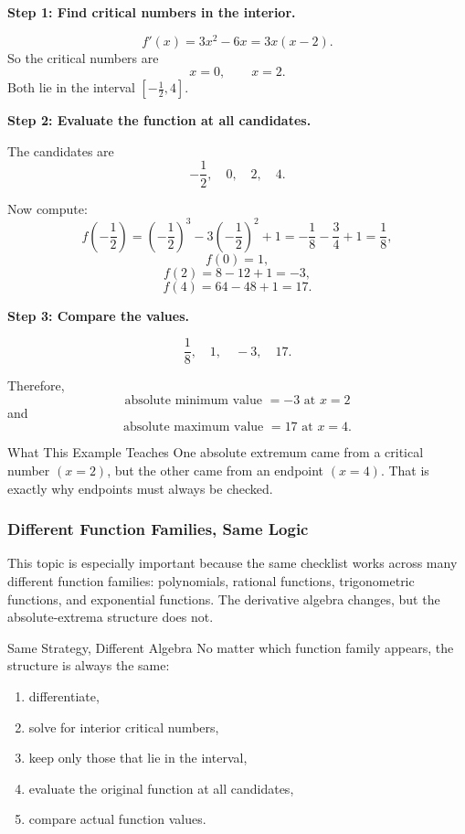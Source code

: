 \documentclass[11pt]{article}
\newcommand{\solution}{\noindent{\textbf{Solution.}}}
\newcommand{\unitsubtopic}[1]{%
\subsubsection{#1}
}
\begin{document}
\solution

\textbf{Step 1: Find critical numbers in the interior.}

\[
f'(x)=3x^2-6x=3x(x-2).
\]
So the critical numbers are
\[
x=0,\qquad x=2.
\]
Both lie in the interval \(\left[-\frac12,4\right]\).

\textbf{Step 2: Evaluate the function at all candidates.}

The candidates are
\[
-\frac12,\quad 0,\quad 2,\quad 4.
\]

Now compute:
\[
f\left(-\frac12\right)=\left(-\frac12\right)^3-3\left(-\frac12\right)^2+1
=-\frac18-\frac34+1=\frac18,
\]
\[
f(0)=1,
\]
\[
f(2)=8-12+1=-3,
\]
\[
f(4)=64-48+1=17.
\]

\textbf{Step 3: Compare the values.}

\[
\frac18,\quad 1,\quad -3,\quad 17.
\]

Therefore,
\[
\boxed{\text{absolute minimum value }=-3 \text{ at } x=2}
\]
and
\[
\boxed{\text{absolute maximum value }=17 \text{ at } x=4.}
\]

\begin{summarybox}{What This Example Teaches}
One absolute extremum came from a critical number \((x=2)\), but the other came from an endpoint \((x=4)\).
That is exactly why endpoints must always be checked.
\end{summarybox}
\newpage
\unitsubtopic{Different Function Families, Same Logic}

\noindent
This topic is especially important because the same checklist works across many different function families:
polynomials, rational functions, trigonometric functions, and exponential functions.
The derivative algebra changes, but the absolute-extrema structure does not.

\begin{theorybox}{Same Strategy, Different Algebra}
No matter which function family appears, the structure is always the same:
\begin{enumerate}
    \item differentiate,
    \item solve for interior critical numbers,
    \item keep only those that lie in the interval,
    \item evaluate the original function at all candidates,
    \item compare actual function values.
\end{enumerate}
\end{theorybox}
\end{document}
